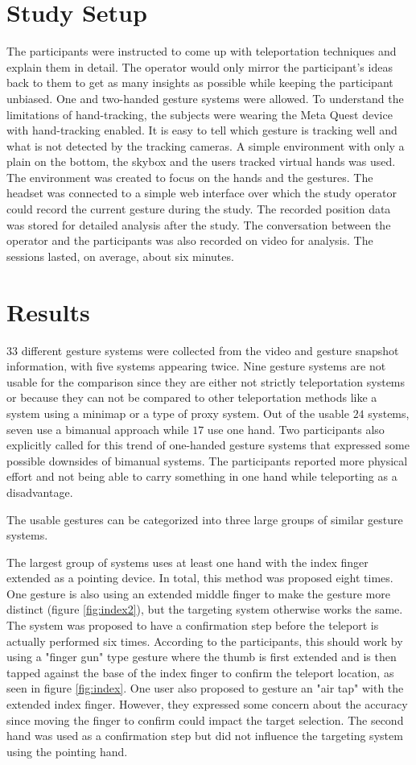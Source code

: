 \section{Study Setup}
The participants were instructed to come up with teleportation techniques and explain them in detail. The operator would only mirror the participant's ideas back to them to get as many insights as possible while keeping the participant unbiased. One and two-handed gesture systems were allowed. To understand the limitations of hand-tracking, the subjects were wearing the Meta Quest device with hand-tracking enabled. It is easy to tell which gesture is tracking well and what is not detected by the tracking cameras. A simple environment with only a plain on the bottom, the skybox and the users tracked virtual hands was used. The environment was created to focus on the hands and the gestures. The headset was connected to a simple web interface over which the study operator could record the current gesture during the study. The recorded position data was stored for detailed analysis after the study. The conversation between the operator and the participants was also recorded on video for analysis. The sessions lasted, on average, about six minutes.

\section{Results}
$33$ different gesture systems were collected from the video and gesture snapshot information, with five systems appearing twice. Nine gesture systems are not usable for the comparison since they are either not strictly teleportation systems or because they can not be compared to other teleportation methods like a system using a minimap or a type of proxy system. Out of the usable $24$ systems, seven use a bimanual approach while $17$ use one hand. Two participants also explicitly called for this trend of one-handed gesture systems that expressed some possible downsides of bimanual systems. The participants reported more physical effort and not being able to carry something in one hand while teleporting as a disadvantage.

The usable gestures can be categorized into three large groups of similar gesture systems. 

The largest group of systems uses at least one hand with the index finger extended as a pointing device. In total, this method was proposed eight times. One gesture is also using an extended middle finger to make the gesture more distinct (figure \ref{fig:index2}), but the targeting system otherwise works the same. The system was proposed to have a confirmation step before the teleport is actually performed six times. According to the participants, this should work by using a "finger gun" type gesture where the thumb is first extended and is then tapped against the base of the index finger to confirm the teleport location, as seen in figure \ref{fig:index}. One user also proposed to gesture an "air tap" with the extended index finger. However, they expressed some concern about the accuracy since moving the finger to confirm could impact the target selection. The second hand was used as a confirmation step but did not influence the targeting system using the pointing hand.

